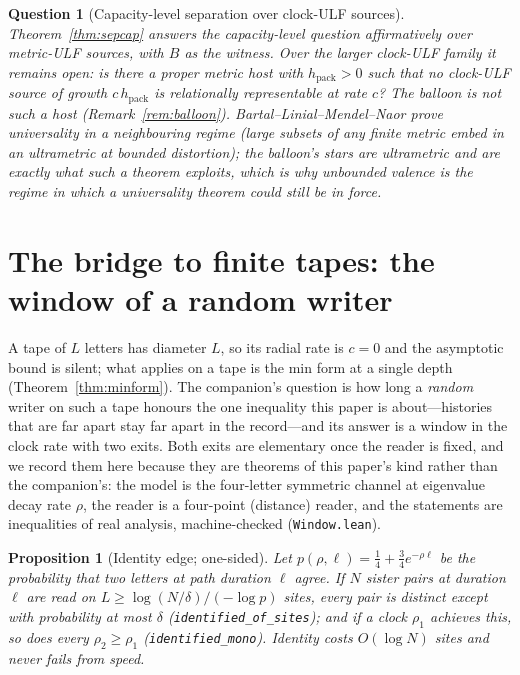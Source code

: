 \documentclass[11pt,reqno]{amsart}
\theoremstyle{plain}
\newtheorem{proposition}[theorem]{Proposition}
\newtheorem{question}[theorem]{Question}
\theoremstyle{definition}
\newcommand{\hpack}{h_{\mathrm{pack}}}
\begin{document}
\begin{question}[Capacity-level separation over clock-ULF sources]\label{q:sep}
Theorem~\ref{thm:sepcap} answers the capacity-level question affirmatively over metric-ULF sources, with $B$ as the witness. Over the larger clock-ULF family it remains open: is there a proper metric host with $\hpack>0$ such that \emph{no} clock-ULF source of growth $c\,\hpack$ is relationally representable at rate $c$? The balloon is not such a host (Remark~\ref{rem:balloon}). Bartal--Linial--Mendel--Naor \cite{blmn2005} prove universality in a neighbouring regime (large subsets of any finite metric embed in an ultrametric at bounded distortion); the balloon's stars are ultrametric and are exactly what such a theorem exploits, which is why unbounded valence is the regime in which a universality theorem could still be in force.
\end{question}

\section{The bridge to finite tapes: the window of a random writer}\label{sec:window}

A tape of $L$ letters has diameter $L$, so its radial rate is $c=0$ and the asymptotic bound is silent; what applies on a tape is the min form at a single depth (Theorem~\ref{thm:minform}). The companion's question is how long a \emph{random} writer on such a tape honours the one inequality this paper is about---histories that are far apart stay far apart in the record---and its answer is a window in the clock rate with two exits. Both exits are elementary once the reader is fixed, and we record them here because they are theorems of this paper's kind rather than the companion's: the model is the four-letter symmetric channel at eigenvalue decay rate $\rho$, the reader is a four-point (distance) reader, and the statements are inequalities of real analysis, machine-checked (\texttt{Window.lean}).

\begin{proposition}[Identity edge; one-sided]\label{prop:identity}
Let $p(\rho,\ell)=\tfrac14+\tfrac34e^{-\rho\ell}$ be the probability that two letters at path duration $\ell$ agree. If $N$ sister pairs at duration $\ell$ are read on $L\ge\log(N/\delta)/(-\log p)$ sites, every pair is distinct except with probability at most $\delta$ (\texttt{identified\_\allowbreak{}of\_\allowbreak{}sites}); and if a clock $\rho_1$ achieves this, so does every $\rho_2\ge\rho_1$ (\texttt{identified\_\allowbreak{}mono}). Identity costs $O(\log N)$ sites and never fails from speed.
\end{proposition}
\end{document}
